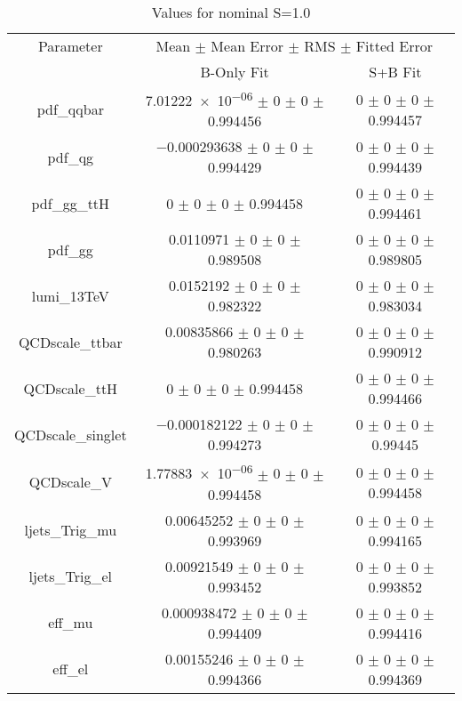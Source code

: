 \begin{table}
\centering
\caption{Values for nominal S=1.0}
\begin{tabular}{ccc}
\toprule
Parameter 	& \multicolumn{2}{c}{Mean $\pm$ Mean Error $\pm$ RMS $\pm$ Fitted Error}\\
 	& B-Only Fit & S+B Fit\\
\midrule
pdf\_qqbar 	& \num{7.01222e-06} $\pm$ \num{0} $\pm$ \num{0} $\pm$ \num{0.994456} 	& \num{0} $\pm$ \num{0} $\pm$ \num{0} $\pm$ \num{0.994457}\\
pdf\_qg 	& \num{-0.000293638} $\pm$ \num{0} $\pm$ \num{0} $\pm$ \num{0.994429} 	& \num{0} $\pm$ \num{0} $\pm$ \num{0} $\pm$ \num{0.994439}\\
pdf\_gg\_ttH 	& \num{0} $\pm$ \num{0} $\pm$ \num{0} $\pm$ \num{0.994458} 	& \num{0} $\pm$ \num{0} $\pm$ \num{0} $\pm$ \num{0.994461}\\
pdf\_gg 	& \num{0.0110971} $\pm$ \num{0} $\pm$ \num{0} $\pm$ \num{0.989508} 	& \num{0} $\pm$ \num{0} $\pm$ \num{0} $\pm$ \num{0.989805}\\
lumi\_13TeV 	& \num{0.0152192} $\pm$ \num{0} $\pm$ \num{0} $\pm$ \num{0.982322} 	& \num{0} $\pm$ \num{0} $\pm$ \num{0} $\pm$ \num{0.983034}\\
QCDscale\_ttbar 	& \num{0.00835866} $\pm$ \num{0} $\pm$ \num{0} $\pm$ \num{0.980263} 	& \num{0} $\pm$ \num{0} $\pm$ \num{0} $\pm$ \num{0.990912}\\
QCDscale\_ttH 	& \num{0} $\pm$ \num{0} $\pm$ \num{0} $\pm$ \num{0.994458} 	& \num{0} $\pm$ \num{0} $\pm$ \num{0} $\pm$ \num{0.994466}\\
QCDscale\_singlet 	& \num{-0.000182122} $\pm$ \num{0} $\pm$ \num{0} $\pm$ \num{0.994273} 	& \num{0} $\pm$ \num{0} $\pm$ \num{0} $\pm$ \num{0.99445}\\
QCDscale\_V 	& \num{1.77883e-06} $\pm$ \num{0} $\pm$ \num{0} $\pm$ \num{0.994458} 	& \num{0} $\pm$ \num{0} $\pm$ \num{0} $\pm$ \num{0.994458}\\
ljets\_Trig\_mu 	& \num{0.00645252} $\pm$ \num{0} $\pm$ \num{0} $\pm$ \num{0.993969} 	& \num{0} $\pm$ \num{0} $\pm$ \num{0} $\pm$ \num{0.994165}\\
ljets\_Trig\_el 	& \num{0.00921549} $\pm$ \num{0} $\pm$ \num{0} $\pm$ \num{0.993452} 	& \num{0} $\pm$ \num{0} $\pm$ \num{0} $\pm$ \num{0.993852}\\
eff\_mu 	& \num{0.000938472} $\pm$ \num{0} $\pm$ \num{0} $\pm$ \num{0.994409} 	& \num{0} $\pm$ \num{0} $\pm$ \num{0} $\pm$ \num{0.994416}\\
eff\_el 	& \num{0.00155246} $\pm$ \num{0} $\pm$ \num{0} $\pm$ \num{0.994366} 	& \num{0} $\pm$ \num{0} $\pm$ \num{0} $\pm$ \num{0.994369}\\

\end{tabular}
\end{table}
